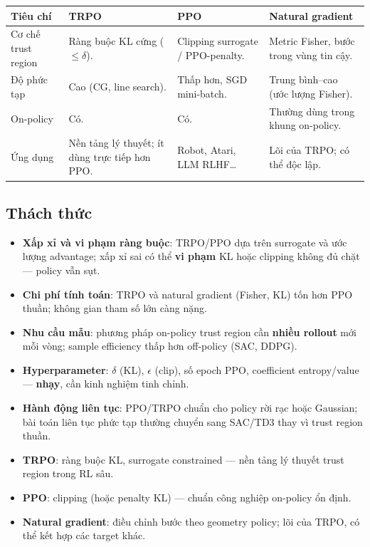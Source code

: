 \begin{vidu}[title={TRPO, PPO và natural gradient}]
\begin{tabularx}{\linewidth}{>{\raggedright\arraybackslash}p{3.2cm}XXX}
\textbf{Tiêu chí} & \textbf{TRPO} & \textbf{PPO} & \textbf{Natural gradient} \\
\midrule
Cơ chế trust region &
Ràng buộc KL cứng ($\leq \delta$). &
Clipping surrogate / PPO-penalty. &
Metric Fisher, bước trong vùng tin cậy. \\
Độ phức tạp &
Cao (CG, line search). &
Thấp hơn, SGD mini-batch. &
Trung bình--cao (ước lượng Fisher). \\
On-policy &
Có. &
Có. &
Thường dùng trong khung on-policy. \\
Ứng dụng &
Nền tảng lý thuyết; ít dùng trực tiếp hơn PPO. &
Robot, Atari, LLM RLHF\ldots &
Lõi của TRPO; có thể độc lập. \\
\end{tabularx}
\end{vidu}

\subsection{Thách thức}

\begin{luuy}[title={Thách thức khi dùng trust region}]
\begin{itemize}
  \item \textbf{Xấp xỉ và vi phạm ràng buộc}: TRPO/PPO dựa trên surrogate và ước lượng advantage; xấp xỉ sai có thể \textbf{vi phạm} KL hoặc clipping không đủ chặt --- policy vẫn sụt.
  \item \textbf{Chi phí tính toán}: TRPO và natural gradient (Fisher, KL) tốn hơn PPO thuần; không gian tham số lớn càng nặng.
  \item \textbf{Nhu cầu mẫu}: phương pháp on-policy trust region cần \textbf{nhiều rollout} mới mỗi vòng; sample efficiency thấp hơn off-policy (SAC, DDPG).
  \item \textbf{Hyperparameter}: $\delta$ (KL), $\epsilon$ (clip), số epoch PPO, coefficient entropy/value --- \textbf{nhạy}, cần kinh nghiệm tinh chỉnh.
  \item \textbf{Hành động liên tục}: PPO/TRPO chuẩn cho policy rời rạc hoặc Gaussian; bài toán liên tục phức tạp thường chuyển sang SAC/TD3 thay vì trust region thuần.
\end{itemize}
\end{luuy}

\begin{tinhchat}[title={Thuật toán deep RL dùng trust region}]
\begin{itemize}
  \item \textbf{TRPO}: ràng buộc KL, surrogate constrained --- nền tảng lý thuyết trust region trong RL sâu.
  \item \textbf{PPO}: clipping (hoặc penalty KL) --- chuẩn công nghiệp on-policy ổn định.
  \item \textbf{Natural gradient}: điều chỉnh bước theo geometry policy; lõi của TRPO, có thể kết hợp các target khác.
\end{itemize}
\end{tinhchat}
